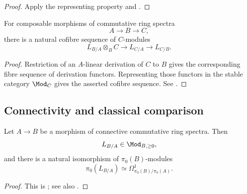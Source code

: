 \begin{proof}
Apply the representing property and
.
\end{proof}

\begin{theorem}
\label{thm:cotangent-transitivity}
For composable morphisms of commutative ring spectra
\[
    A
    \longrightarrow
    B
    \longrightarrow
    C,
\]
there is a natural cofibre sequence of $C$-modules
\[
    L_{B/A}\otimes_BC
    \longrightarrow
    L_{C/A}
    \longrightarrow
    L_{C/B}.
\]
\end{theorem}

\begin{proof}
Restriction of an $A$-linear derivation of $C$ to $B$ gives the
corresponding fibre sequence of derivation functors. Representing those
functors in the stable category $\Mod_C$ gives the asserted cofibre
sequence. See
\cite[Proposition~7.3.3.5 and Corollary~7.3.3.6]{LurieHigherAlgebra}.
\end{proof}

\subsection{Connectivity and classical comparison}

\begin{proposition}
\label{prop:cotangent-connectivity-degree-zero}
Let $A\to B$ be a morphism of connective commutative ring spectra. Then
\[
    L_{B/A}
    \in
    \Mod_{B,\geq0},
\]
and there is a natural isomorphism of $\pi_0(B)$-modules
\[
    \pi_0(L_{B/A})
    \simeq
    \Omega^1_{\pi_0(B)/\pi_0(A)}.
\]
\end{proposition}

\begin{proof}
This is
\cite[Proposition~7.4.3.9]{LurieHigherAlgebra}; see also
\cite[Section~2]{LurieDAGIV}.
\end{proof}

